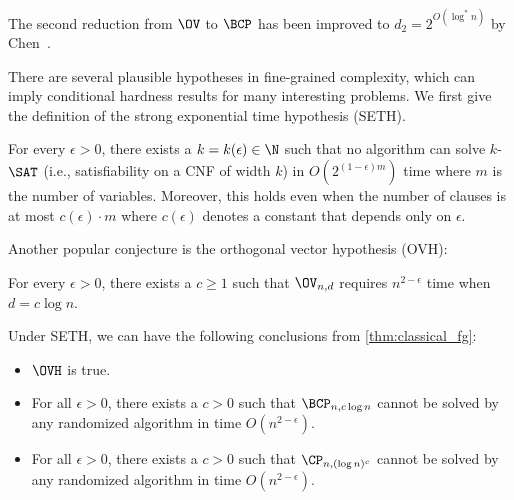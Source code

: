 \begin{remark}
The second reduction from $\OV$ to $\BCP$ has been improved to $d_2 = 2^{O(\log^* n)}$ by Chen~\cite{r17}.
\end{remark}

There are several plausible hypotheses in fine-grained complexity, which can imply conditional hardness results for many interesting problems. We first give the definition of the strong exponential time hypothesis (SETH). 
\begin{hypothesis}
For every $\epsilon > 0$, there exists a $k = k(\epsilon) \in \N$ such that no algorithm can solve $k$-$\SAT$ (i.e., satisfiability on a CNF of width $k$) in $O(2^{(1 - \epsilon)m})$ time where $m$ is the number of variables. Moreover, this holds even when the number of clauses is at most $c(\epsilon) \cdot m$ where $c(\epsilon)$ denotes a constant that depends only on $\epsilon$.
\end{hypothesis}

Another popular conjecture is the orthogonal vector hypothesis (\textsf{OVH}):
\begin{definition}
For every $\epsilon > 0$,  
there exists a $c\ge 1$ such that $\OV_{n,d}$ requires $n^{2-\epsilon}$ time when $d=c\log n$.
\end{definition}

\begin{remark}
Under SETH, we can have the following conclusions from \cref{thm:classical_fg}: 
\begin{itemize}
    \item $\OVH$ is true. 
    \item For all $\epsilon>0$, there exists a $c>0$ such that $\BCP_{n,c\log n}$ cannot be solved by any randomized algorithm in time $O(n^{2-\epsilon})$.
    \item For all $\epsilon>0$, there exists a $c>0$ such that $\CP_{n,(\log n)^c}$ cannot be solved by any randomized algorithm in time $O(n^{2-\epsilon})$.
\end{itemize}
\end{remark}

